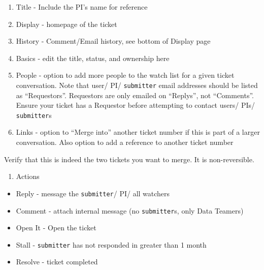 \documentclass[
  letterpaper,
  DIV=11,
  numbers=noendperiod]{scrreprt}
\providecommand{\tightlist}{%
  \setlength{\itemsep}{0pt}\setlength{\parskip}{0pt}}\usepackage{longtable,booktabs,array}
\begin{document}
\begin{enumerate}
\def\labelenumi{\arabic{enumi}.}
\tightlist
\item
  Title - Include the PI's name for reference\\
\item
  Display - homepage of the ticket\\
\item
  History - Comment/Email history, see bottom of Display page\\
\item
  Basics - edit the title, status, and ownership here\\
\item
  People - option to add more people to the watch list for a given
  ticket conversation. Note that user/ PI/ \texttt{submitter} email
  addresses should be listed as ``Requestors''. Requestors are only
  emailed on ``Replys'', not ``Comments''. Ensure your ticket has a
  Requestor before attempting to contact users/ PIs/
  \texttt{submitter}s\\
\item
  Links - option to ``Merge into'' another ticket number if this is part
  of a larger conversation. Also option to add a reference to another
  ticket number
\end{enumerate}

\begin{tcolorbox}[enhanced jigsaw, arc=.35mm, toprule=.15mm, opacityback=0, colbacktitle=quarto-callout-warning-color!10!white, colframe=quarto-callout-warning-color-frame, toptitle=1mm, rightrule=.15mm, title=\textcolor{quarto-callout-warning-color}{\faExclamationTriangle}\hspace{0.5em}{Warning}, coltitle=black, bottomtitle=1mm, bottomrule=.15mm, titlerule=0mm, left=2mm, opacitybacktitle=0.6, breakable, leftrule=.75mm, colback=white]
Verify that this is indeed the two tickets you want to merge. It is
non-reversible.
\end{tcolorbox}

\begin{enumerate}
\def\labelenumi{\arabic{enumi}.}
\setcounter{enumi}{6}
\tightlist
\item
  Actions\\
\end{enumerate}

\begin{itemize}
\tightlist
\item
  Reply - message the \texttt{submitter}/ PI/ all watchers\\
\item
  Comment - attach internal message (no \texttt{submitter}s, only Data
  Teamers)\\
\item
  Open It - Open the ticket\\
\item
  Stall - \texttt{submitter} has not responded in greater than 1 month\\
\item
  Resolve - ticket completed\\
\end{itemize}
\end{document}
